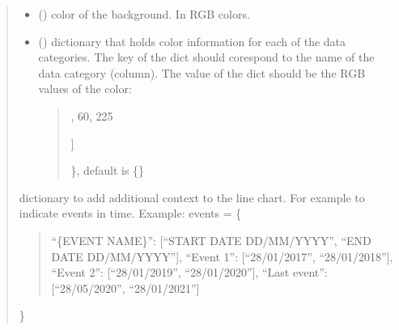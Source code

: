 \documentclass[letterpaper,10pt,english]{sphinxmanual}
\begin{document}
\begin{fulllineitems}
\begin{quote}
\begin{description}
\begin{itemize}
\item {} 
\sphinxAtStartPar
{} (\sphinxstyleliteralemphasis{\sphinxupquote{ (}}\sphinxstyleliteralemphasis{\sphinxupquote{, }}\sphinxstyleliteralemphasis{\sphinxupquote{, }}\sphinxstyleliteralemphasis{\sphinxupquote{)}}) \textendash{} color of the background. In RGB colors.

\item {} 
\sphinxAtStartPar
{} () \textendash{} 
\sphinxAtStartPar
dictionary that holds color information for each of the data categories. The key of the dict should
corespond to the name of the data category (column). The value of the dict should be the RGB values of the color:
\begin{quote}
\begin{description}
\sphinxlineitem{\{}\begin{description}
\sphinxlineitem{“United States”: {[}}
,
60,
225

\end{description}

\sphinxAtStartPar
{]}

\end{description}

\sphinxAtStartPar
\}, default is \{\}
\end{quote}


\end{itemize}

\sphinxAtStartPar
dictionary to add additional context to the line chart. For example to indicate events in time. Example:
events = \{
\begin{quote}

\sphinxAtStartPar
“\{EVENT NAME\}”: {[}“START DATE DD/MM/YYYY”, “END DATE DD/MM/YYYY”{]},
“Event 1”: {[}“28/01/2017”, “28/01/2018”{]},
“Event 2”: {[}“28/01/2019”, “28/01/2020”{]},
“Last event”: {[}“28/05/2020”, “28/01/2021”{]}
\end{quote}

\sphinxAtStartPar
\}

\end{description}\end{quote}

\end{fulllineitems}
\end{document}
